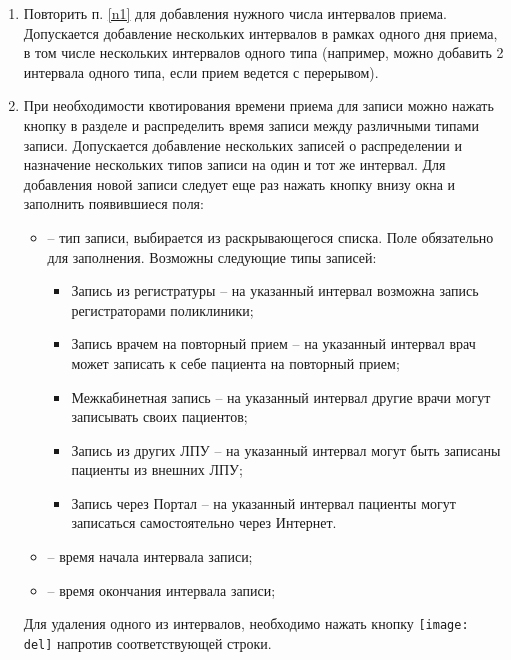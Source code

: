 {\begin{enumerate}
\begin{figure}[ht]\centering
 \texttt{[image: pol\_ttbl5]}
 \caption{Окно <<Заполнение расписания>> после внесения данных}
 \label{img_pol_ttbl5}
\end{figure}

 \item Повторить п. \ref{n1} для добавления нужного числа интервалов приема. Допускается добавление нескольких интервалов в рамках одного дня приема, в том числе нескольких интервалов одного типа (например, можно добавить 2 интервала одного типа, если прием ведется с перерывом). 
 
 \item При необходимости квотирования времени приема для записи можно нажать кнопку  в разделе  и распределить время записи между различными типами записи. Допускается добавление нескольких записей о распределении и назначение нескольких типов записи на один и тот же интервал. Для добавления новой записи следует еще раз нажать кнопку  внизу окна и заполнить появившиеся поля:
 \begin{itemize}
 	\item {} -- тип записи, выбирается из раскрывающегося списка. Поле обязательно для заполнения. Возможны следующие типы записей: 
 	\begin{itemize}
 		\item Запись из регистратуры -- на указанный интервал возможна запись регистраторами поликлиники;
 		\item Запись врачем на повторный прием -- на указанный интервал врач может записать к себе пациента на повторный прием;
 		\item Межкабинетная запись -- на указанный интервал другие врачи могут записывать своих пациентов;
 		\item Запись из других ЛПУ -- на указанный интервал могут быть записаны пациенты из внешних ЛПУ;
 		\item Запись через Портал -- на указанный интервал пациенты могут записаться самостоятельно через Интернет.		
 	\end{itemize}
 	\item {} -- время начала интервала записи;
 	\item {} -- время окончания интервала записи;	
 \end{itemize}
 Для удаления одного из интервалов, необходимо нажать кнопку \texttt{[image: del]} напротив соответствующей строки. 
  

\end{enumerate}}
